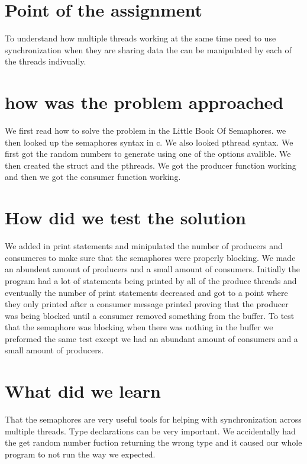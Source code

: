\documentclass[letterpaper,10pt,titlepage]{article}
\begin{document}
\section{Point of the assignment}
To understand how multiple threads working at the same time need to use
synchronization when they are sharing data the can be manipulated by each of
the threads indivually.

\section{how was the problem approached}
We first read how to solve the problem in the Little Book Of Semaphores. we 
then looked up the semaphores syntax in c. We also looked pthread syntax. We 
first got the random numbers to generate using one of the options avalible. 
We then created the struct and the pthreads. We got the producer function 
working and then we got the consumer function working.

\section{How did we test the solution}
We added in print statements and minipulated the number of producers and 
consumeres to make sure that the semaphores were properly blocking. We 
made an abundent amount of producers and a small amount of consumers. Initially 
the program had a lot of statements being printed by all of the produce threads 
and eventually the number of print statements decreased and got to a point where 
they only printed after a consumer message printed proving that the producer 
was being blocked until a consumer removed something from the buffer. To test 
that the semaphore was blocking when there was nothing in the buffer we 
preformed the same test except we had an abundant amount of consumers and a 
small amount of producers. 

\section{What did we learn}
That the semaphores are very useful tools for helping with synchronization 
across multiple threads. Type declarations can be very important. We 
accidentally had the get random number fuction returning the wrong type and 
it caused our whole program to not run the way we expected. 
\end{document}
